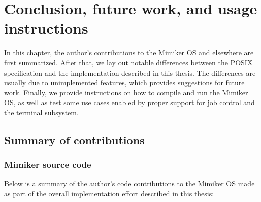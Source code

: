 \documentclass[shortabstract, manyadvisors, english, mgr]{iithesis}
\begin{document}
\chapter{Conclusion, future work, and usage instructions}\label{chap:conclusion}

In this chapter, the author's contributions to the Mimiker OS and elsewhere are
first summarized. After that, we lay out notable differences between the POSIX
specification and the implementation described in this thesis. The differences
are usually due to unimplemented features, which provides suggestions for future
work. Finally, we provide instructions on how to compile and run the Mimiker OS,
as well as test some use cases enabled by proper support for job control and the
terminal subsystem.

\section{Summary of contributions}
\subsection*{Mimiker source code}
Below is a summary of the author's code contributions to the Mimiker OS made
as part of the overall implementation effort described in this thesis:
\end{document}
